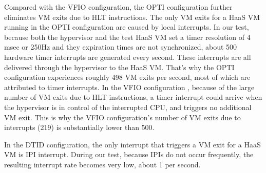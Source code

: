 Compared with the VFIO configuration, the OPTI configuration further eliminates VM exits due to HLT instructions.
 The only VM exits for a HaaS VM running in the OPTI configuration are caused by local interrupts.
 In our test, because both the hypervisor and the test HaaS VM set a timer 
 resolution of 4 msec or 250Hz and they expiration times
 are not synchronized, about 500 hardware timer interrupts are generated every second.
 These interrupts are all delivered through the hypervisor to the HaaS VM. That's why the OPTI configuration 
 experiences roughly 498 VM exits per second, most of which are attributed to timer interrupts.
 In the VFIO configuration , because of the large number of VM exits due to HLT instructions, a timer interrupt could arrive when the hypervisor is in control of the interrupted CPU, and triggers no additional VM exit.
 This is why the VFIO configuration's number of  VM exits  due to interrupts (219) is substantially lower than 500. 
  
In the DTID configuration, the only interrupt that triggers a VM exit for a HaaS VM is IPI interrupt. 
During our test, because IPIs do not occur frequently,  the resulting interrupt rate becomes very low, about 1 per second. 




